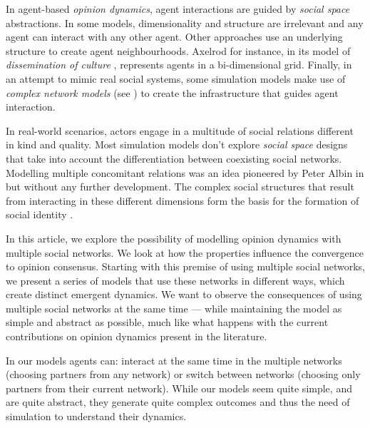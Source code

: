 \documentclass[preprint,number]{elsarticle}
\begin{document}
	In agent-based \textit{opinion dynamics}, agent interactions are guided by \textit{social space} abstractions. In some models, dimensionality and structure are irrelevant and any agent can interact with any other agent.
	Other approaches use an underlying structure to create agent neighbourhoods. Axelrod for instance, in its model of \textit{dissemination of culture} \cite{Axelrod1997}, represents agents in a bi-dimensional grid. Finally, in an attempt to mimic real social systems, some simulation models make use of \textit{complex network models} (see \cite{Weisbuch2004}) to create the infrastructure that guides agent interaction.
	

	In real-world scenarios, actors engage in a multitude of social relations different in kind and quality. Most simulation models don't explore \textit{social space} designs that take into account the differentiation between coexisting social networks. Modelling multiple concomitant relations was an idea pioneered by Peter Albin in \cite{Albin1975} but without any further development. The complex social structures that result from interacting in these different dimensions form the basis for the formation of social identity \cite{Roccas2002,Ellemers2002}.
	
	In this article, we explore the possibility of modelling opinion dynamics with multiple social networks. We look at how the properties influence the convergence to opinion consensus. Starting with this premise of 
	using multiple social networks, we present a series of models that use these networks in different ways, which create distinct emergent dynamics. We want to observe the consequences of using multiple social networks at the same time --- while maintaining the model as simple and abstract as possible, much like what happens with the current contributions on opinion dynamics present in the literature. 
	
	In our models agents can: interact at the same time in the multiple networks (choosing partners from any network) or switch between networks (choosing only partners from their current network). While our models seem quite simple, and are quite abstract, they generate quite complex outcomes and thus the need of simulation to understand their dynamics.
	
\end{document}
